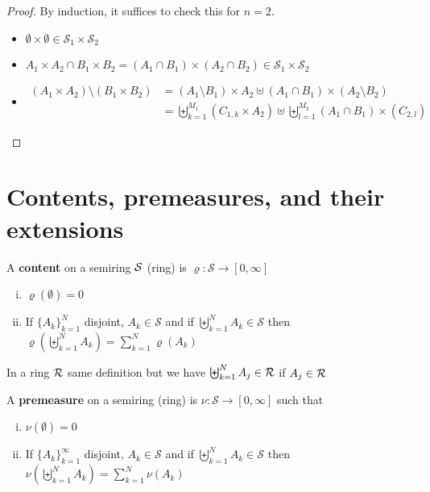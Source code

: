 \begin{proof}
  By induction, it suffices to check this for $n = 2$.
  \begin{itemize}
    \item $\emptyset \times \emptyset \in \mathcal{S}_1 \times \mathcal{S}_2$
    \item $A_1 \times A_2 \cap B_1 \times B_2 = (A_1 \cap B_1) \times (A_2 \cap B_2) \in \mathcal{S}_1 \times \mathcal{S}_2$
    \item \begin{align*}
      (A_1 \times A_2) \setminus (B_1 \times B_2) &= (A_1 \setminus B_1) \times A_2 \uplus (A_1 \cap B_1) \times (A_2 \setminus B_2) \\
      &= \biguplus_{k=1}^{M_1} (C_{1, k} \times A_2) \uplus \biguplus_{l=1}^{M_2} (A_1 \cap B_1) \times (C_{2, l})
    \end{align*}
  \end{itemize}
\end{proof}

\section{Contents, premeasures, and their extensions}

\begin{definition}
  A \textbf{content} on a semiring $\mathcal S$ (ring) is 
  $\varrho : \mathcal{S} \to [0, \infty]$
  \begin{enumerate}[(i)]
    \item $\varrho(\emptyset) = 0$
    \item If $\{A_k\}_{k=1}^N$ disjoint, $A_k \in \mathcal{S}$ and if $\biguplus_{k=1}^N A_k \in \mathcal{S}$ then 
      $\varrho\left(\biguplus_{k=1}^N A_k\right) = \sum_{k=1}^N \varrho(A_k)$
  \end{enumerate}
\end{definition}

\begin{remark}
  In a ring $\mathcal R$ same definition but we have $\biguplus_{k=1}^N A_j \in \mathcal R$ if $A_j \in \mathcal R$
\end{remark}

\begin{definition}
  A \textbf{premeasure} on a semiring (ring) is $\nu: \mathcal{S} \to [0, \infty]$ such that
  \begin{enumerate}[(i)]
    \item $\nu(\emptyset) = 0$
    \item If $\{A_k\}_{k=1}^\infty$ disjoint, $A_k \in \mathcal{S}$ and if $\biguplus_{k=1}^N A_k \in \mathcal{S}$ then 
      $\nu\left(\biguplus_{k=1}^N A_k\right) = \sum_{k=1}^N \nu(A_k)$
  \end{enumerate}
\end{definition}

